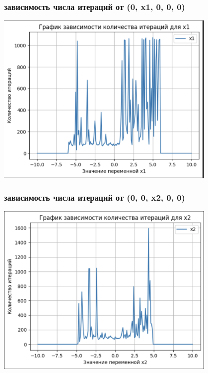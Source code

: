 \documentclass[12pt,pdf,hyperref={unicode}]{beamer}
\begin{document}
\begin{frame}
\frametitle{зависимость числа итераций от (0, x1, 0, 0, 0) }
\begin{center}
    \includegraphics[width=0.8\textwidth]{x1.png}
\end{center}
\end{frame}

\begin{frame}
\frametitle{зависимость числа итераций от (0, 0, x2, 0, 0) }
\begin{center}
    \includegraphics[width=0.8\textwidth]{x2.png}
\end{center}
\end{frame}
\end{document}
